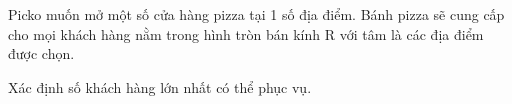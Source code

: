 Picko muốn mở một số cửa hàng pizza tại 1 số địa điểm. Bánh pizza sẽ cung cấp cho mọi khách hàng nằm trong hình tròn bán kính R với tâm là các địa điểm được chọn.  

   Xác định số khách hàng lớn nhất có thể phục vụ.